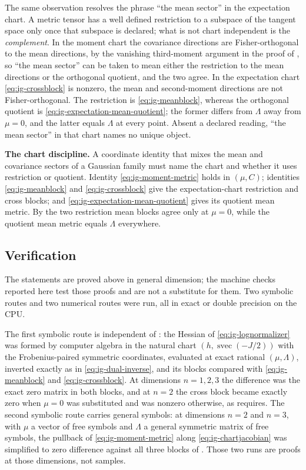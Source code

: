 The same observation resolves the phrase ``the mean sector'' in the expectation chart. A metric tensor has a well defined restriction to a subspace of the tangent space only once that subspace is declared; what is not chart independent is the \emph{complement}. In the moment chart the covariance directions are Fisher-orthogonal to the mean directions, by the vanishing third-moment argument in the proof of , so ``the mean sector'' can be taken to mean either the restriction to the mean directions or the orthogonal quotient, and the two agree. In the expectation chart \eqref{eq:ig-crossblock} is nonzero, the mean and second-moment directions are not Fisher-orthogonal. The restriction is \eqref{eq:ig-meanblock}, whereas the orthogonal quotient is \eqref{eq:ig-expectation-mean-quotient}; the former differs from $\Lambda$ away from $\mu=0$, and the latter equals $\Lambda$ at every point. Absent a declared reading, ``the mean sector'' in that chart names no unique object.

\medskip
\noindent\textbf{The chart discipline.} A coordinate identity that mixes the mean and covariance sectors of a Gaussian family must name the chart and whether it uses restriction or quotient. Identity \eqref{eq:ig-moment-metric} holds in $(\mu,C)$; identities \eqref{eq:ig-meanblock} and \eqref{eq:ig-crossblock} give the expectation-chart restriction and cross blocks; and \eqref{eq:ig-expectation-mean-quotient} gives its quotient mean metric. By  the two restriction mean blocks agree only at $\mu=0$, while the quotient mean metric equals $\Lambda$ everywhere. 

\subsection*{Verification}

The statements are proved above in general dimension; the machine checks reported here test those proofs and are not a substitute for them. Two symbolic routes and two numerical routes were run, all in exact or double precision on the CPU.

The first symbolic route is independent of : the Hessian of \eqref{eq:ig-lognormalizer} was formed by computer algebra in the natural chart $(h,\operatorname{svec}(-J/2))$ with the Frobenius-paired symmetric coordinates, evaluated at exact rational $(\mu,\Lambda)$, inverted exactly as in \eqref{eq:ig-dual-inverse}, and its blocks compared with \eqref{eq:ig-meanblock} and \eqref{eq:ig-crossblock}. At dimensions $n=1,2,3$ the difference was the exact zero matrix in both blocks, and at $n=2$ the cross block became exactly zero when $\mu=0$ was substituted and was nonzero otherwise, as  requires. The second symbolic route carries general symbols: at dimensions $n=2$ and $n=3$, with $\mu$ a vector of free symbols and $\Lambda$ a general symmetric matrix of free symbols, the pullback of \eqref{eq:ig-moment-metric} along \eqref{eq:ig-chartjacobian} was simplified to zero difference against all three blocks of . Those two runs are proofs at those dimensions, not samples.

